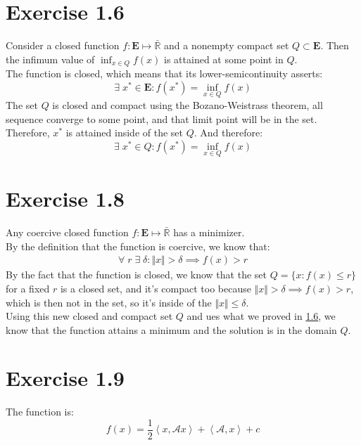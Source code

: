 \documentclass[]{article}
\begin{document}
\section*{Exercise 1.6}\label{sec:1.6}
    Consider a closed function $f:\mathbf{E}\mapsto \bar{\mathbb{R}}$ and a nonempty compact set $Q\subset \mathbf{E}$. Then the infimum value of $\inf_{x\in Q}f(x)$ is attained at some point in $Q$. 
    \\[1.1em]
    The function is closed, which means that its lower-semicontinuity asserts: 
    $$
        \exists\; x^* \in \mathbf{E}: f(x^*) = \inf_{x\in Q} f(x)
    $$
    The set $Q$ is closed and compact using the Bozano-Weistrass theorem, all sequence converge to some point, and that limit point will be in the set. Therefore, $x^*$ is attained inside of the set $Q$. And therefore: 
    $$
        \exists\; x^* \in Q: f(x^*) = \inf_{x\in Q} f(x)
    $$
\section*{Exercise 1.8}
    Any coercive closed function $f:\mathbf{E}\mapsto \bar{\mathbb{R}}$ has a minimizer. 
    \\[1.1em]
    By the definition that the function is coercive, we know that: 
    \begin{align*}\tag{1.8.1}\label{eqn:1.8.1}
        \forall \; r\; \exists\; \delta: \Vert x\Vert > \delta \implies f(x) > r
    \end{align*}
    By the fact that the function is closed, we know that the set $Q = \{x: f(x)\le r\}$ for a fixed $r$ is a closed set, and it's compact too because $\Vert x\Vert > \delta \implies f(x) > r$, which is then not in the set, so it's inside of the $\Vert x\Vert \le \delta$. 
    \\
    Using this new closed and compact set $Q$ and ues what we proved in \hyperref[sec:1.6]{1.6}, we know that the function attains a minimum and the solution is in the domain $Q$. 
\section*{Exercise 1.9}
    The function is: 
        $$
            f(x) = \frac{1}{2}\left\langle x, \mathcal{A}x \right\rangle + 
            \left\langle \mathcal{A}, x \right\rangle + c
        $$
\end{document}
